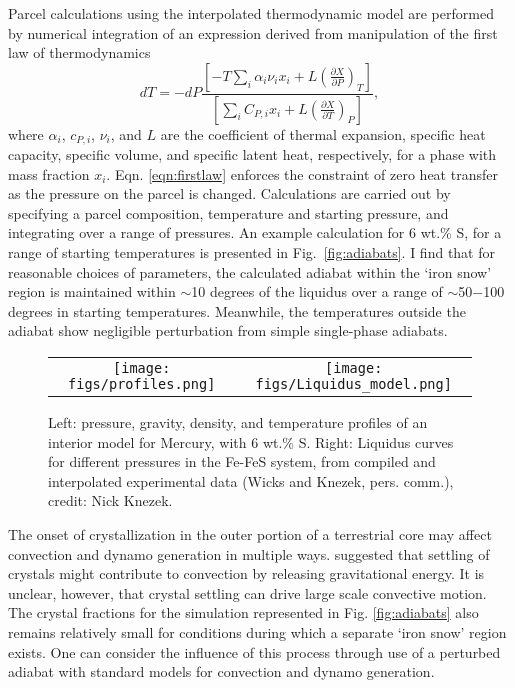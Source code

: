 Parcel calculations using the interpolated thermodynamic model are performed
by numerical integration of an expression derived from manipulation of the
first law of thermodynamics
\begin{equation}
  \label{eqn:firstlaw}
  d T = -d P \frac{\left[-T \sum_i \alpha_i\nu_ix_i +
    L\left(\frac{\partial{X}}{\partial{P}}\right)_T \right] } 
  {\left[ \sum_i C_{P,i}x_i + L \left(
    \frac{\partial{X}}{\partial{T}}\right)_P \right] },
\end{equation}
where $\alpha_i$, $c_{P,i}$, $\nu_i$, and $L$ are the coefficient of thermal
expansion, specific heat capacity, specific volume, and specific latent heat,
respectively, for a phase with mass fraction $x_i$. Eqn. \ref{eqn:firstlaw}
enforces the constraint of zero heat transfer as the pressure on the parcel is
changed. Calculations are carried out by specifying a parcel composition,
temperature and starting pressure, and integrating over a range of pressures.
An example calculation for 6 wt.\% S, for a range of starting temperatures is
presented in Fig.~\ref{fig:adiabats}. I find that for reasonable choices of
parameters, the calculated adiabat within the `iron snow' region is maintained
within $\sim$10 degrees of the liquidus over a range of $\sim$50$-$100 degrees
in starting temperatures. Meanwhile, the temperatures outside the adiabat show
negligible perturbation from simple single-phase adiabats.

 \begin{figure}[h] %
   \centering
\begin{tabular}{cc}
 \texttt{[image: figs/profiles.png]} &
 \texttt{[image: figs/Liquidus\_model.png]} \\
\end{tabular}
   \caption{ Left: pressure, gravity, density, and temperature profiles of an
interior model for Mercury, with 6 wt.\% S.  Right: Liquidus curves for different
pressures in the Fe-FeS system, from compiled and interpolated experimental data
(Wicks and Knezek, pers. comm.), credit: Nick Knezek.}
  \label{fig:interior_model}
\end{figure}


The onset of crystallization in the outer portion of a terrestrial core may
affect convection and dynamo generation in multiple ways. 
\citet{Hauck2006} suggested that settling of crystals might contribute to
convection by releasing gravitational energy. It is unclear, however, that
crystal settling can drive large scale convective motion. The crystal fractions
for the simulation represented in Fig. \ref{fig:adiabats} also remains
relatively small for conditions during which a separate `iron snow' region
exists. One can consider the influence of this process through use of a
perturbed adiabat with standard models for convection and dynamo generation.

